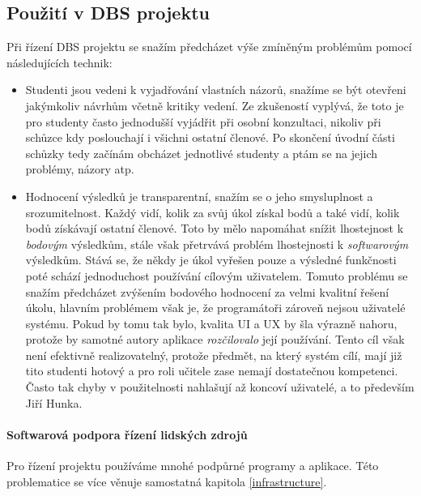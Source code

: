\subsection{Použití v DBS projektu}
Při řízení DBS projektu se snažím předcházet výše zmíněným problémům pomocí následujících technik:
\begin{itemize}
	\item Studenti jsou vedeni k vyjadřování vlastních názorů, snažíme se být otevřeni jakýmkoliv návrhům včetně kritiky vedení. Ze zkušeností vyplývá, že toto je pro studenty často jednodušší vyjádřit při osobní konzultaci, nikoliv při schůzce kdy poslouchají i všichni ostatní členové. Po skončení úvodní  části schůzky tedy začínám obcházet jednotlivé studenty a ptám se na jejich problémy, názory atp.
	\item Hodnocení výsledků je transparentní, snažím se o jeho smysluplnost a srozumitelnost. Každý vidí, kolik za svůj úkol získal bodů a také vidí, kolik bodů získávají ostatní členové. Toto by mělo napomáhat snížit lhostejnost k \emph{bodovým} výsledkům, stále však přetrvává problém lhostejnosti k \emph{softwarovým} výsledkům. Stává se, že někdy je úkol vyřešen pouze  a výsledné funkčnosti poté schází jednoduchost používání cílovým uživatelem. Tomuto problému se snažím předcházet zvýšením bodového hodnocení za velmi kvalitní řešení úkolu, hlavním problémem však je, že programátoři zároveň nejsou uživatelé systému. Pokud by tomu tak bylo, kvalita UI a UX by šla výrazně nahoru, protože by samotné autory aplikace \emph{rozčilovalo} její používání. Tento cíl však není efektivně realizovatelný, protože předmět, na který systém cílí, mají již tito studenti hotový a pro roli učitele zase nemají dostatečnou kompetenci. Často tak chyby v použitelnosti nahlašují až koncoví uživatelé, a to především Jiří Hunka.
\end{itemize}



\paragraph{Softwarová podpora řízení lidských zdrojů}

Pro řízení projektu používáme mnohé podpůrné programy a aplikace. Této problematice se více věnuje samostatná kapitola \ref{infrastructure}.
